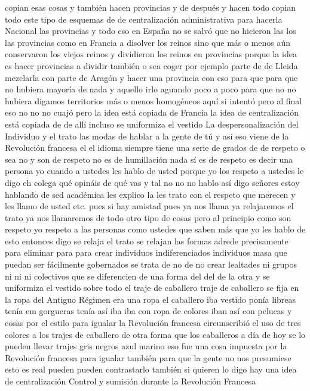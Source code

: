 copian esas cosas y también hacen provincias y de después y hacen todo copian todo este tipo de esquemas de
de centralización administrativa para hacerla Nacional las provincias y todo eso en España no se salvó
que no hicieron las los las provincias como en Francia a disolver los reinos sino que más o menos aún conservaron los viejos reinos
y dividieron los reinos en provincias porque la idea es hacer provincias a dividir también
o sea coger por ejemplo parte de de Lleida mezclarla con parte de Aragón y hacer una provincia con eso
para que para que no hubiera mayoría de nada y aquello irlo aguando poco a poco para que no no hubiera digamos territorios más o menos homogéneos
aquí si intentó pero al final eso no no no cuajó pero la idea está copiada de Francia
la idea de centralización está copiada de de allí incluso se uniformiza el vestido
La despersonalización del Individuo
y el trato las modas de hablar a la gente de tú y así eso viene de la Revolución francesa
el el idioma siempre tiene una serie de grados de de respeto o sea no y son de respeto no es de humillación nada
sí es de respeto es decir una persona yo cuando a ustedes les hablo de usted porque yo los respeto a ustedes
le digo eh colega qué opináis de qué vas y tal no no no hablo así digo señores estoy hablando de sed académica
les explico la les trato con el respeto que merecen y les llamo de usted etc. pues si hay amistad pues ya nos llama
ya relajaremos el trato ya nos llamaremos de todo otro tipo de cosas pero al principio como son respeto
yo respeto a las personas como ustedes que saben más que yo les hablo de esto entonces digo
se relaja el trato se relajan las formas adrede precisamente para eliminar para para crear individuos indiferenciados
individuos masa que puedan ser fácilmente gobernados se trata de no de no crear lealtades ni grupos ni ni ni colectivos
que se diferencien de una forma del del de la otra y se uniformiza el vestido sobre todo el traje de caballero
traje de caballero se fija en la ropa del Antiguo Régimen era una ropa el caballero iba vestido
ponía libreas tenía em gorgueras tenía así iba iba con ropa de colores
iban así con pelucas y cosas por el estilo para igualar la Revolución francesa circunscribió el uso de tres colores
a los trajes de caballero de otra forma que los caballeros a día de hoy se lo pueden llevar trajes gris negros azul marino
eso fue una cosa impuesta por la Revolución francesa para igualar también para que la gente no nos presumiese esto es real
pueden pueden contrastarlo también si quieren lo digo hay una idea de centralización
Control y sumisión durante la Revolución Francesa
